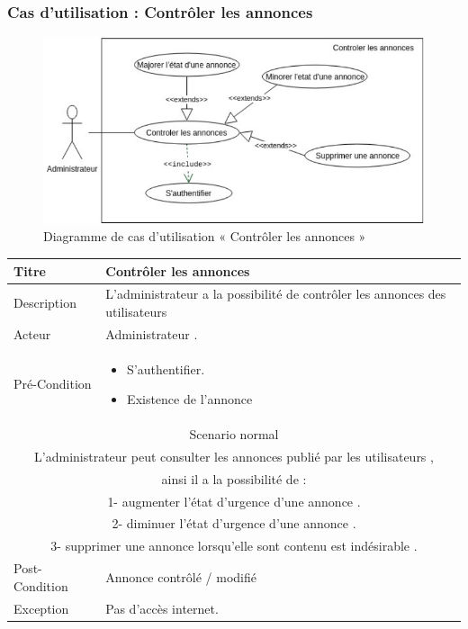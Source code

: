\documentclass[11pt,a4paper,oneside]{book}
\begin{document}
			\subsubsection{Cas d’utilisation : Contrôler les annonces}
			\begin{figure}[H]
				\centering
				\includegraphics[width=1\textwidth]{Diagrammes/controle_annonces}
				\caption{Diagramme de cas d’utilisation « Contrôler les annonces »}
				\label{fig:controleannonces}
			\end{figure}
			
			\begin{tabular}{ |p{3cm}|p{6cm}|  }
				
				\hline
				Titre&  Contrôler les annonces\\
				\hline
				Description  & 
				L’administrateur a la possibilité de contrôler les annonces des utilisateurs\\
				\hline
				Acteur&  Administrateur .\\
				\hline
				Pré-Condition & \begin{itemize}
					\item S’authentifier.
					\item Existence de l’annonce
				\end{itemize}
				\\
				\hline
				\multicolumn{2}{|c|}{Scenario normal} \\
				\hline
				\multicolumn{2}{|c|}{L’administrateur peut consulter les annonces publié par les utilisateurs ,}\\
				\multicolumn{2}{|c|}{	 ainsi il a la possibilité de :}\\
				\multicolumn{2}{|c|}{1- augmenter l’état d’urgence d’une annonce .} \\
				\multicolumn{2}{|c|}{2- diminuer l’état d’urgence d’une annonce .} \\
				\multicolumn{2}{|c|}{3- supprimer une annonce lorsqu’elle sont contenu est indésirable . } \\
				
				\hline
				Post-Condition& Annonce contrôlé / modifié  \\
				\hline
				Exception&  Pas d’accès internet. 
				\\
				\hline
			\end{tabular}
\end{document}
